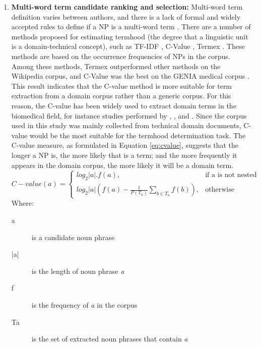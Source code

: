 \documentclass[Journal,InsideFigs, DoubleSpace]{ascelike} %
\begin{document}
{\begin{enumerate} [label=\roman*]
\begin{itemize}
	\end{itemize}
	Since NPs with low occurrence frequencies that are unlikely to be technical terms should be automatically eliminated. With the frequency threshold of 2, the list consists of 112,024  terms. The list size drops to 8,922 when a threshold of 50 is used. In this research we used a threshold of 50.
	\item \textbf{Multi-word term candidate ranking and selection:} Multi-word term definition varies between authors, and there is a lack of formal and widely accepted rules to define if a NP is a multi-word term \cite{frantzi20}. There are a number of methods proposed for estimating termhood (the degree that a linguistic unit is a domain-technical concept), such as TF-IDF  \cite{sparck72,salton88}, C-Value \cite{frantzi20}, Termex  \cite{sclano07}. These methods are based on the occurrence frequencies of NPs in the corpus. Among these methods, Termex outperformed other methods on the Wikipedia corpus, and C-Value was the best on the GENIA medical corpus \cite{zhang08}. This result indicates that the C-value method is more suitable for term extraction from a domain corpus rather than a generic corpus. For this reason, the C-value has been widely used to extract domain terms in the biomedical field, for instance studies performed by , , and . Since the corpus used in this study was mainly collected from technical domain documents, C-value would be the most suitable for the termhood determination task. The C-value measure, as formulated in Equation \ref{eq:cvalue}, suggests that the longer a NP is, the more likely that is a term; and the more frequently it appears in the domain corpus, the more likely it will be a domain term.
	\begin{equation}
	C-value(a)=
	\begin{cases}
	log_2|a|.f(a), & \text{if a is not nested} \\
	log_2|a|(f(a)-\frac{1}{P(T_a)}\sum_{b\in T_a} f(b)), & \text{otherwise}
	\end{cases}
	\label{eq:cvalue}
	\end{equation}
	Where:
	\begin{description}
		\item[a] is a candidate noun phrase
		\item[|a|] is the length of noun phrase \textit{a}
		\item[f] is the frequency of \textit{a} in the corpus
		\item[Ta] is the set of extracted noun phrases that contain \textit{a}

\end{description}
\end{enumerate}}
\end{document}

